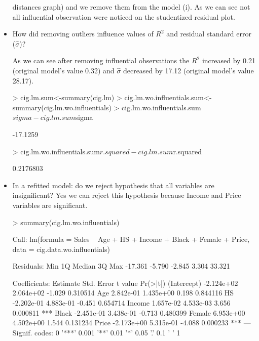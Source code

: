 \documentclass[a4paper]{article}
\begin{document}
\begin{itemize}
distances graph) and we remove them from the model (i).
As we can see not all influential observation were noticed on the studentized residual plot.
\begin{Schunk}
\end{Schunk}
\item How did removing outliers influence values of $R^2$ and residual standard
error ($\hat\sigma$)?

As we can see after removing influential observations the $R^2$ increased by
0.21 (original model's value 0.32) and $\hat\sigma$ decreased by 17.12 (original
model's value 28.17).
\begin{Schunk}
\begin{Sinput}
> cig.lm.sum<-summary(cig.lm)
> cig.lm.wo.influentials.sum<-summary(cig.lm.wo.influentials)
> cig.lm.wo.influentials.sum$sigma-cig.lm.sum$sigma
\end{Sinput}
\begin{Soutput}
[1] -17.1259
\end{Soutput}
\begin{Sinput}
> cig.lm.wo.influentials.sum$r.squared-cig.lm.sum$r.squared
\end{Sinput}
\begin{Soutput}
[1] 0.2176803
\end{Soutput}
\end{Schunk}
\item In a refitted model: do we reject hypothesis that all variables are
insignificant?
Yes we can reject this hypothesis because Income and Price variables are
significant. 
\begin{Schunk}
\begin{Sinput}
> summary(cig.lm.wo.influentials)
\end{Sinput}
\begin{Soutput}
Call:
lm(formula = Sales ~ Age + HS + Income + Black + Female + Price, 
    data = cig.data.wo.influentials)

Residuals:
    Min      1Q  Median      3Q     Max 
-17.361  -5.790  -2.845   3.304  33.321 

Coefficients:
              Estimate Std. Error t value Pr(>|t|)    
(Intercept) -2.124e+02  2.064e+02  -1.029 0.310514    
Age          2.842e-01  1.435e+00   0.198 0.844116    
HS          -2.202e-01  4.883e-01  -0.451 0.654714    
Income       1.657e-02  4.533e-03   3.656 0.000811 ***
Black       -2.451e-01  3.438e-01  -0.713 0.480399    
Female       6.953e+00  4.502e+00   1.544 0.131234    
Price       -2.173e+00  5.315e-01  -4.088 0.000233 ***
---
Signif. codes:  0 '***' 0.001 '**' 0.01 '*' 0.05 '.' 0.1 ' ' 1


\end{Soutput}
\end{Schunk}
\end{itemize}
\end{document}

